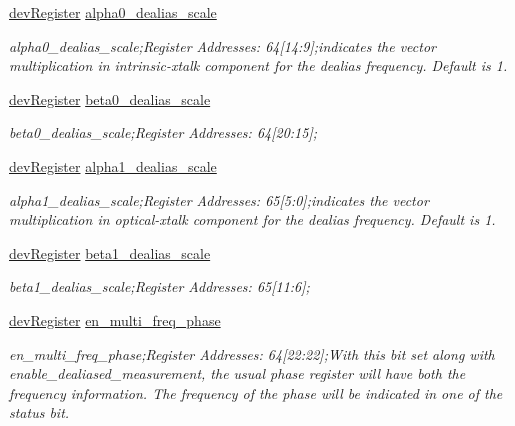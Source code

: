 \begin{DoxyCompactItemize}
\mbox{\hyperlink{classdev_register}{dev\+Register}} \mbox{\hyperlink{class_o_p_t3101_registers_a2a875ef5db97ed494d2b9ff8d135d3b4}{alpha0\+\_\+dealias\+\_\+scale}}
\begin{DoxyCompactList}\small\item\em alpha0\+\_\+dealias\+\_\+scale;Register Addresses\+: 64\mbox{[}14\+:9\mbox{]};indicates the vector multiplication in intrinsic-\/xtalk component for the dealias frequency. Default is \textquotesingle{}1\textquotesingle{}. \end{DoxyCompactList}\item 
\mbox{\hyperlink{classdev_register}{dev\+Register}} \mbox{\hyperlink{class_o_p_t3101_registers_adc40199c2876c1455b1994c9ce1050a0}{beta0\+\_\+dealias\+\_\+scale}}
\begin{DoxyCompactList}\small\item\em beta0\+\_\+dealias\+\_\+scale;Register Addresses\+: 64\mbox{[}20\+:15\mbox{]}; \end{DoxyCompactList}\item 
\mbox{\hyperlink{classdev_register}{dev\+Register}} \mbox{\hyperlink{class_o_p_t3101_registers_a6e0490d84a9d525806f226e26261d708}{alpha1\+\_\+dealias\+\_\+scale}}
\begin{DoxyCompactList}\small\item\em alpha1\+\_\+dealias\+\_\+scale;Register Addresses\+: 65\mbox{[}5\+:0\mbox{]};indicates the vector multiplication in optical-\/xtalk component for the dealias frequency. Default is \textquotesingle{}1\textquotesingle{}. \end{DoxyCompactList}\item 
\mbox{\hyperlink{classdev_register}{dev\+Register}} \mbox{\hyperlink{class_o_p_t3101_registers_ad1e9ac7d5df7991ef1b7f3a7c2b08b7b}{beta1\+\_\+dealias\+\_\+scale}}
\begin{DoxyCompactList}\small\item\em beta1\+\_\+dealias\+\_\+scale;Register Addresses\+: 65\mbox{[}11\+:6\mbox{]}; \end{DoxyCompactList}\item 
\mbox{\hyperlink{classdev_register}{dev\+Register}} \mbox{\hyperlink{class_o_p_t3101_registers_aadad890efb400dc11a81714a167f0fb9}{en\+\_\+multi\+\_\+freq\+\_\+phase}}
\begin{DoxyCompactList}\small\item\em en\+\_\+multi\+\_\+freq\+\_\+phase;Register Addresses\+: 64\mbox{[}22\+:22\mbox{]};With this bit set along with enable\+\_\+dealiased\+\_\+measurement, the usual phase register will have both the frequency information. The frequency of the phase will be indicated in one of the status bit. \end{DoxyCompactList}\item 

\end{DoxyCompactItemize}
